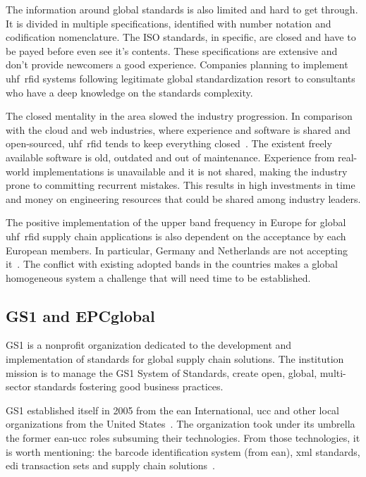 The information around global standards is also limited and hard to get through. It is divided in multiple specifications, identified with number notation and codification nomenclature. 
The ISO standards, in specific, are closed and have to be payed before even see it's contents.
These specifications are extensive and don't provide newcomers a good experience. 
Companies planning to implement \acs{uhf}~\acs{rfid} systems following legitimate global standardization resort to consultants who have a deep knowledge on the standards complexity.

The closed mentality in the area slowed the industry progression. In comparison with the cloud and web industries, where experience and software is shared and open-sourced, \acs{uhf}~\acs{rfid} tends to keep everything closed~\cite{WhatCouldSlow}. The existent freely available software is old, outdated and out of maintenance. Experience from real-world implementations is unavailable and it is not shared, making the industry prone to committing recurrent mistakes. This results in high investments in time and money on engineering resources that could be shared among industry leaders.

The positive implementation of the upper band frequency in Europe for global \acs{uhf}~\acs{rfid} supply chain applications is also dependent on the acceptance by each European members. In particular, Germany and Netherlands are not accepting it~\cite{EUUpperBand}. The conflict with existing adopted bands in the countries makes a global homogeneous system a challenge that will need time to be established.

\subsection{GS1 and EPCglobal}

GS1 is a nonprofit organization dedicated to the development and implementation of standards for global supply chain solutions. 
The institution mission is to manage the GS1 System of Standards, create open, global, multi-sector standards fostering good business practices.

GS1 established itself in 2005 from the \ac{ean} International, \ac{ucc} and other local organizations from the United States~\cite{PublicationLEBENSMITTELZEITUNGa}.
The organization took under its umbrella the former \acs{ean}-\acs{ucc} roles subsuming their technologies. From those technologies, it is worth mentioning: the barcode identification system (from \ac{ean}), \ac{xml} standards, \ac{edi} transaction sets and supply chain solutions~\cite{lahiriRFIDSourcebook2005}.

